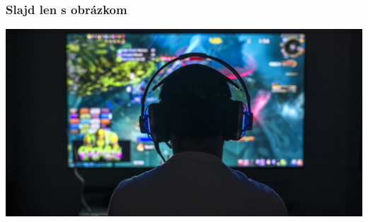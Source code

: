 \documentclass{beamer}
\begin{document}
\begin{frame}[fragile=singleslide]\frametitle{Slajd len s obrázkom}
\includegraphics[scale=.35]{Video-game-addiction-(1)-guide-detail.jpg}
\end{frame}
\end{document}
